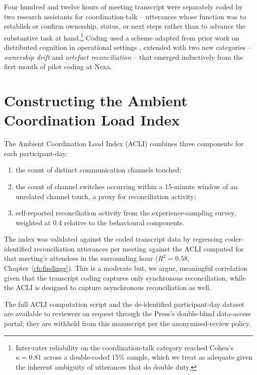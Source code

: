 Four hundred and twelve hours of meeting transcript were separately coded
by two research assistants for coordination-talk -- utterances whose
function was to establish or confirm ownership, status, or next steps
rather than to advance the substantive task at hand.\footnote{Inter-rater
reliability on the coordination-talk category reached
Cohen's~$\kappa = 0.81$ across a double-coded 15\% sample, which we treat as
adequate given the inherent ambiguity of utterances that do double duty.}
Coding used a scheme adapted from prior work on distributed cognition in
operational settings \citep{hollan2000distributed}, extended with two new
categories -- \emph{ownership drift} and \emph{artefact reconciliation} --
that emerged inductively from the first month of pilot coding at
Nexa.

\section{Constructing the Ambient Coordination Load Index}

The Ambient Coordination Load Index (ACLI) combines three components for each participant-day:
\begin{enumerate}[label=(\roman*)]
  \item the count of distinct communication channels touched;
  \item the count of channel switches occurring within a 15-minute window
        of an unrelated channel touch, a proxy for reconciliation activity;
  \item self-reported reconciliation activity from the experience-sampling
        survey, weighted at 0.4 relative to the behavioural components.
\end{enumerate}
The index was validated against the coded transcript data by regressing
coder-identified reconciliation utterances per meeting against the
ACLI computed for that meeting's attendees in the surrounding hour
($R^2 = 0.58$, Chapter~\ref{ch:findings}). This is a moderate but, we
argue, meaningful correlation given that the transcript coding captures
only synchronous reconciliation, while the ACLI is designed to capture
asynchronous reconciliation as well.

\begin{editorialnote}
The full ACLI computation script and the de-identified participant-day
dataset are available to reviewers on request through the Press's
double-blind data-access portal; they are withheld from this manuscript
per the anonymised-review policy.
\end{editorialnote}

